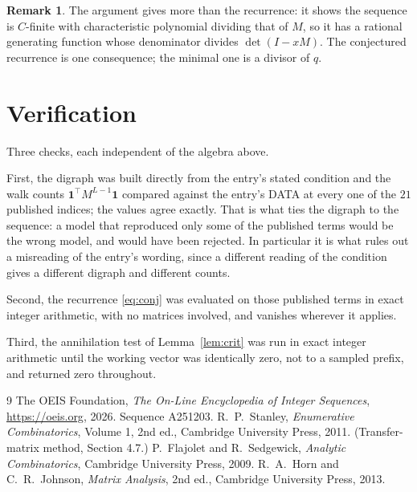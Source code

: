 \documentclass[11pt,a4paper]{article}
\theoremstyle{plain}
\theoremstyle{definition}
\newtheorem{remark}[theorem]{Remark}
\begin{document}
\begin{remark}
The argument gives more than the recurrence: it shows the sequence is $C$-finite with
characteristic polynomial dividing that of $M$, so it has a rational generating function
whose denominator divides $\det(I-xM)$. The conjectured recurrence is one consequence; the
minimal one is a divisor of $q$.
\end{remark}

\section{Verification}

Three checks, each independent of the algebra above.

First, the digraph was built directly from the entry's stated condition and the walk counts
$\mathbf{1}^{\!\top}M^{L-1}\mathbf{1}$ compared against the entry's DATA at
every one of the $21$ published indices; the values agree exactly. That is what ties
the digraph to the sequence: a model that reproduced only some of the published terms would
be the wrong model, and would have been rejected. In particular it is what rules out a
misreading of the entry's wording, since a different reading of the condition gives a
different digraph and different counts.

Second, the recurrence \eqref{eq:conj} was evaluated on those published terms in exact
integer arithmetic, with no matrices involved, and vanishes wherever it applies.

Third, the annihilation test of Lemma~\ref{lem:crit} was run in exact integer arithmetic
until the working vector was identically zero, not to a sampled prefix, and returned zero
throughout.

\begin{thebibliography}{9}
 The OEIS Foundation, \emph{The On-Line Encyclopedia of Integer
Sequences}, \url{https://oeis.org}, 2026. Sequence A251203.
 R.~P.~Stanley, \emph{Enumerative Combinatorics}, Volume 1, 2nd ed.,
Cambridge University Press, 2011. (Transfer-matrix method, Section 4.7.)
 P.~Flajolet and R.~Sedgewick, \emph{Analytic Combinatorics}, Cambridge
University Press, 2009.
 R.~A.~Horn and C.~R.~Johnson, \emph{Matrix Analysis}, 2nd ed., Cambridge
University Press, 2013.
\end{thebibliography}
\end{document}
